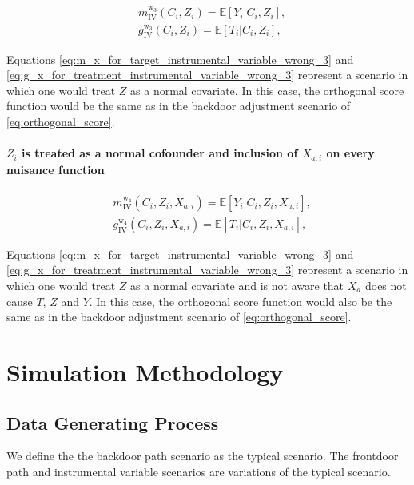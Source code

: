 \documentclass{article}
\numberwithin{equation}{section}
\begin{document}
\begin{align}
    & m_{\text{IV}}^{\text{w}_3}(C_i, Z_i) = \mathbb{E}[Y_i | C_i, Z_i],
    \label{eq:m_x_for_target_instrumental_variable_wrong_3}
    \\
    & g_{\text{IV}}^{\text{w}_3}(C_i, Z_i) = \mathbb{E}[T_i | C_i, Z_i],
    \label{eq:g_x_for_treatment_instrumental_variable_wrong_3}
\end{align}

Equations \eqref{eq:m_x_for_target_instrumental_variable_wrong_3} and \eqref{eq:g_x_for_treatment_instrumental_variable_wrong_3} represent a scenario in which one would treat $Z$ as a normal covariate. In this case, the orthogonal score function would be the same as in the backdoor adjustment scenario of \eqref{eq:orthogonal_score}.

\paragraph{$Z_i$ is treated as a normal cofounder and inclusion of $X_{a, i}$ on every nuisance function}

\begin{align}
    & m_{\text{IV}}^{\text{w}_4}(C_i, Z_i, X_{a, i}) = \mathbb{E}[Y_i | C_i, Z_i, X_{a, i}],
    \label{eq:m_x_for_target_instrumental_variable_wrong_3}
    \\
    & g_{\text{IV}}^{\text{w}_4}(C_i, Z_i, X_{a, i}) = \mathbb{E}[T_i | C_i, Z_i, X_{a, i}],
    \label{eq:g_x_for_treatment_instrumental_variable_wrong_3}
\end{align}

Equations \eqref{eq:m_x_for_target_instrumental_variable_wrong_3} and \eqref{eq:g_x_for_treatment_instrumental_variable_wrong_3} represent a scenario in which one would treat $Z$ as a normal covariate and is not aware that $X_a$ does not cause $T$, $Z$ and $Y$. In this case, the orthogonal score function would also be the same as in the backdoor adjustment scenario of \eqref{eq:orthogonal_score}.

\section{Simulation Methodology}

\subsection{Data Generating Process}

We define the the backdoor path scenario as the typical scenario. The frontdoor path and instrumental variable scenarios are variations of the typical scenario.
\end{document}
